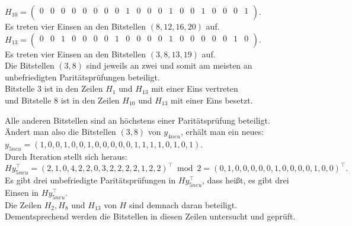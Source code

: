 \begin{Beispiel}
    $H_{10}=\left( \begin{array}{rrrrrrrrrrrrrrrrrrrr}
        0 & 0 & 0 & 0 & 0 & 0 & 0 & 0 & 1 & 0 & 0 & 0 & 1 & 0 & 0 & 1 & 0 & 0 & 0 & 1 \\
       \end{array}\right). 
    $\\
    Es treten vier Einsen an den Bitstellen $(8, 12, 16, 20)$ auf.\\
    
    $H_{13}= \left( \begin{array}{rrrrrrrrrrrrrrrrrrrr}
        0 & 0 & 1 & 0 & 0 & 0 & 0 & 1 & 0 & 0 & 0 & 0 & 1 & 0 & 0 & 0 & 0 & 0 & 1 & 0 \\
       \end{array}\right). 
    $\\
    Es treten vier Einsen an den Bitstellen $(3, 8, 13, 19)$ auf.\\
    
    Die Bitstellen $(3, 8)$ sind jeweils an zwei und somit am meisten an unbefriedigten Paritätsprüfungen beteiligt.\\
    Bitstelle $3$ ist in den Zeilen $H_1$ und $H_{13}$ mit einer Eins vertreten\\
    und Bitstelle $8$ ist in den Zeilen $H_{10}$ und $H_{13}$ mit einer Eins besetzt.\\
    \pagebreak
    
    Alle anderen Bitstellen sind an höchstens einer Paritätsprüfung beteiligt.\\
    Ändert man also die Bitstellen $(3, 8)$ von $y_{4neu}$, erhält man ein neues:\\
    $y_{5neu} = (1,0,0,1,0,0,1,0,0,0,0,0,1,1,1,1,0,1,0,1).$\\
    
    Durch Iteration stellt sich heraus:\\
    $Hy_{5neu}^\intercal= (2,1,0,4,2,2,0,3,2,2,2,2,1,2,2)^\intercal \bmod 2= (0,1,0,0,0,0,0,1,0,0,0,0,1,0,0)^\intercal.$\\
    
    Es gibt drei unbefriedigte Paritätsprüfungen in $Hy_{5neu}^\intercal$,
    dass hei\ss{}t, es gibt drei Einsen in $Hy_{5neu}^\intercal.$\\
    Die Zeilen $H_2, H_8$ und $H_{13}$ von $H$ sind demnach daran beteiligt.\\ 
    Dementsprechend werden die Bitstellen in diesen Zeilen untersucht und geprüft.\\
    

\end{Beispiel}
